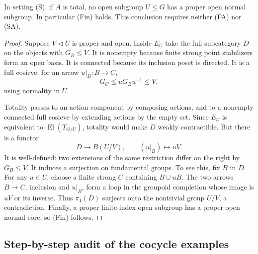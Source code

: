 \begin{proposition}
\label{B:no-open-quotients}
In setting (S), if $A$ is total, no open subgroup $U\leq G$
has a proper open normal subgroup. In particular (Fin) holds.
This conclusion requires neither (FA) nor (SA).
\end{proposition}
\begin{proof}
Suppose $V\lhd U$ is proper and open. Inside $E_U$ take the
full subcategory $D$ on the objects with $G_B\leq V$. It is
nonempty because finite strong point stabilizers form an open
basis. It is connected because its inclusion poset is
directed. It is a full cosieve: for an arrow $u|_B:B\to C$,
\[
 G_C\leq uG_Bu^{-1}\leq V,
\]
using normality in $U$.

Totality passes to an action component by composing actions,
and to a nonempty connected full cosieve by extending actions
by the empty set. Since $E_U$ is equivalent to
$\operatorname{El}(T_{G/U})$, totality would make $D$ weakly
contractible. But there is a functor
\[
 D\longrightarrow B(U/V),\qquad (u|_B)\longmapsto uV.
\]
It is well-defined: two extensions of the same restriction
differ on the right by $G_B\leq V$. It induces a surjection on
fundamental groups. To see this, fix $B$ in $D$. For any $u\in U$,
choose a finite strong $C$ containing $B\cup uB$. The two
arrows $B\to C$, inclusion and $u|_B$, form a loop in the
groupoid completion whose image is $uV$ or its inverse.
Thus $\pi_1(D)$ surjects onto the nontrivial group $U/V$,
a contradiction. Finally, a proper finite-index open subgroup
has a proper open normal core, so (Fin) follows.
\end{proof}

\subsection{Step-by-step audit of the cocycle examples}

